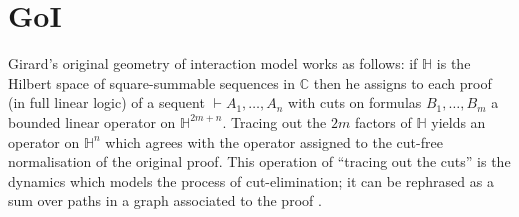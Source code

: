 \documentclass[english,letter paper,12pt,reqno]{article}
\theoremstyle{example}
\numberwithin{equation}{section}
\begin{document}
\section{GoI}

Girard's original geometry of interaction model \cite{girard_goi1} works as follows: if $\mathbb{H}$ is the Hilbert space of square-summable sequences in $\mathbb{C}$ then he assigns to each proof (in full linear logic) of a sequent $\vdash A_1,\ldots,A_n$ with cuts on formulas $B_1,\ldots,B_m$ a bounded linear operator on $\mathbb{H}^{2m+n}$. Tracing out the $2m$ factors of $\mathbb{H}$ yields an operator on $\mathbb{H}^n$ which agrees with the operator assigned to the cut-free normalisation of the original proof. This operation of ``tracing out the cuts'' is the dynamics which models the process of cut-elimination; it can be rephrased as a sum over paths in a graph associated to the proof \cite{danos_regnier2}.
\end{document}
